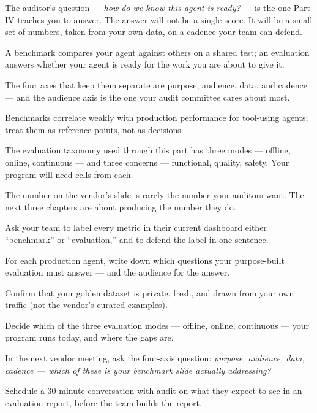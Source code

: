 The auditor's question --- \textit{how do we know this agent is ready?} --- is the one Part IV teaches you to answer. The answer will not be a single score. It will be a small set of numbers, taken from your own data, on a cadence your team can defend.

\TNrule

\stoptwocol

\begin{TNkeytakeaways}
\item A benchmark compares your agent against others on a shared test; an evaluation answers whether your agent is ready for the work you are about to give it.
\item The four axes that keep them separate are purpose, audience, data, and cadence --- and the audience axis is the one your audit committee cares about most.
\item Benchmarks correlate weakly with production performance for tool-using agents; treat them as reference points, not as decisions.
\item The evaluation taxonomy used through this part has three modes --- offline, online, continuous --- and three concerns --- functional, quality, safety. Your program will need cells from each.
\item The number on the vendor's slide is rarely the number your auditors want. The next three chapters are about producing the number they do.
\end{TNkeytakeaways}

\begin{TNchecklist}
\item Ask your team to label every metric in their current dashboard either ``benchmark'' or ``evaluation,'' and to defend the label in one sentence.
\item For each production agent, write down which questions your purpose-built evaluation must answer --- and the audience for the answer.
\item Confirm that your golden dataset is private, fresh, and drawn from your own traffic (not the vendor's curated examples).
\item Decide which of the three evaluation modes --- offline, online, continuous --- your program runs today, and where the gaps are.
\item In the next vendor meeting, ask the four-axis question: \textit{purpose, audience, data, cadence --- which of these is your benchmark slide actually addressing?}
\item Schedule a 30-minute conversation with audit on what they expect to see in an evaluation report, before the team builds the report.
\end{TNchecklist}



